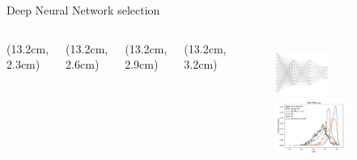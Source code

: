 \begin{frame}{Deep Neural Network selection}
\begin{columns}
\begin{textblock*}{5cm}(13.2cm, 2.3cm) 
\end{textblock*}
\begin{textblock*}{5cm}(13.2cm, 2.6cm) %
\end{textblock*}
\begin{textblock*}{5cm}(13.2cm, 2.9cm) %
\end{textblock*}
\begin{textblock*}{5cm}(13.2cm, 3.2cm) %
\end{textblock*}
\begin{figure}
   \begin{overprint}
   \centering\includegraphics[width=0.5\textwidth]{Part3/Img/DNN.png}
   \centering\includegraphics[width=0.7\textwidth]{Part3/Img/dHH_SM.pdf}
   \end{overprint}
\end{figure}


\end{columns}
\end{frame}
